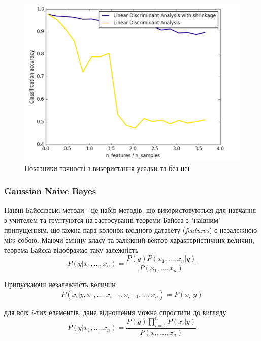 \begin{figure}[h!]
  \includegraphics[width=\linewidth]{figures/shrinkage.png}
  \caption{Показники точності з використання усадки та без неї}
  \label{fig:shrinkage}
\end{figure}

\subsubsection{Gaussian Naive Bayes}
Наївні Байєсівські методи - це набір методів, що використовуються для навчання з учителем та ґрунтуются на застосуванні теореми Байєса з "наївним" припущенням, що кожна пара колонок вхідного датасету (\textit{features}) є незалежною між собою. Маючи змінну класу та залежний вектор характеристичних величин, теорема Байєса відображає таку залежність 
\begin{equation}
    \label{eq:naive_bayes_0}
    P(y|x_{1}, \ldots, x_{n}) = \frac{P(y)P(x_{1}, \ldots, x_{n}|y)}{P(x_{1}, \ldots, x_{n})}
\end{equation}

Припускаючи незалежність величин
\begin{equation}
    \label{eq:naive_bayes_1}
    P(x_{i}|y, x_{1}, \ldots, x_{i-1}, x_{i+1}, \ldots, x_{n}) = P(x_{i}|y)
\end{equation}

для всіх $i$-тих елементів, дане відношення можна спростити до вигляду
\begin{equation}
    \label{eq:naive_bayes_2}
    P(y|x_{1}, \ldots, x_{n}) = \frac{P(y)\prod_{i=1}^n P(x_{i}|y)}{P(x_{i}, \ldots, x_{n})}
\end{equation}

